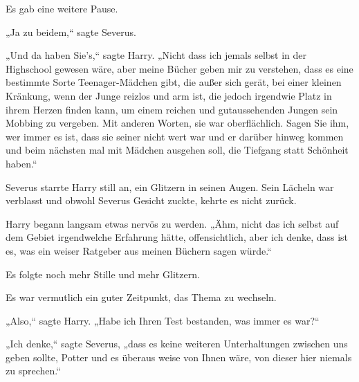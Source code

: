 Es gab eine weitere Pause.

„Ja zu beidem,“ sagte Severus.

„Und da haben Sie's,“ sagte Harry. „Nicht dass ich jemals selbst in der Highschool gewesen wäre, aber meine Bücher geben mir zu verstehen, dass es eine bestimmte Sorte Teenager-Mädchen gibt, die außer sich gerät, bei einer kleinen Kränkung, wenn der Junge reizlos und arm ist, die jedoch irgendwie Platz in ihrem Herzen finden kann, um einem reichen und gutaussehenden Jungen sein Mobbing zu vergeben. Mit anderen Worten, sie war oberflächlich. Sagen Sie ihm, wer immer es ist, dass sie seiner nicht wert war und er darüber hinweg kommen und beim nächsten mal mit Mädchen ausgehen soll, die Tiefgang statt Schönheit haben.“

Severus starrte Harry still an, ein Glitzern in seinen Augen. Sein Lächeln war verblasst und obwohl Severus Gesicht zuckte, kehrte es nicht zurück.

Harry begann langsam etwas nervös zu werden. „Ähm, nicht das ich selbst auf dem Gebiet irgendwelche Erfahrung hätte, offensichtlich, aber ich denke, dass ist es, was ein weiser Ratgeber aus meinen Büchern sagen würde.“

Es folgte noch mehr Stille und mehr Glitzern.

Es war vermutlich ein guter Zeitpunkt, das Thema zu wechseln.

„Also,“ sagte Harry. „Habe ich Ihren Test bestanden, was immer es war?“

„Ich denke,“ sagte Severus, „dass es keine weiteren Unterhaltungen zwischen uns geben sollte, Potter und es überaus weise von Ihnen wäre, von dieser hier niemals zu sprechen.“

